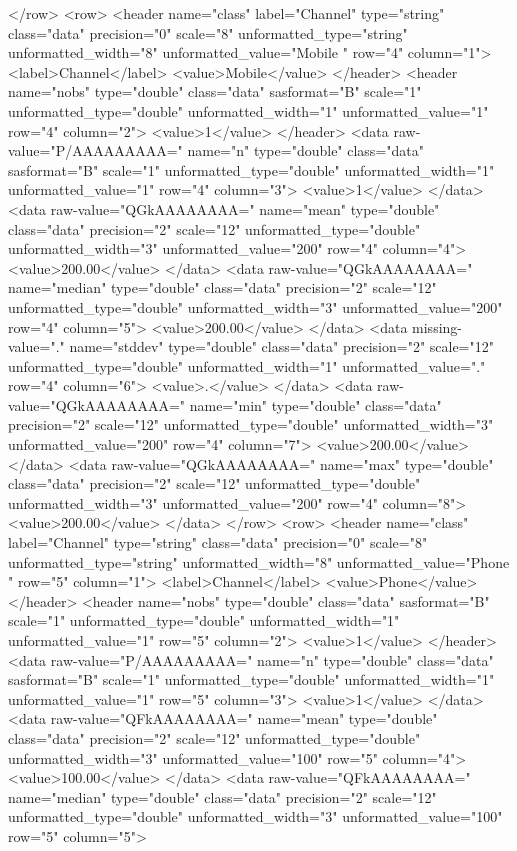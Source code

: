 </row>
<row>
<header name="class" label="Channel" type="string" class="data" precision="0" scale="8" unformatted_type="string" unformatted_width="8" unformatted_value="Mobile  " row="4" column="1">
<label>Channel</label>
<value>Mobile</value>
</header>
<header name="nobs" type="double" class="data" sasformat="B" scale="1" unformatted_type="double" unformatted_width="1" unformatted_value="1" row="4" column="2">
<value>1</value>
</header>
<data raw-value="P/AAAAAAAAA=" name="n" type="double" class="data" sasformat="B" scale="1" unformatted_type="double" unformatted_width="1" unformatted_value="1" row="4" column="3">
<value>1</value>
</data>
<data raw-value="QGkAAAAAAAA=" name="mean" type="double" class="data" precision="2" scale="12" unformatted_type="double" unformatted_width="3" unformatted_value="200" row="4" column="4">
<value>200.00</value>
</data>
<data raw-value="QGkAAAAAAAA=" name="median" type="double" class="data" precision="2" scale="12" unformatted_type="double" unformatted_width="3" unformatted_value="200" row="4" column="5">
<value>200.00</value>
</data>
<data missing-value="." name="stddev" type="double" class="data" precision="2" scale="12" unformatted_type="double" unformatted_width="1" unformatted_value="." row="4" column="6">
<value>.</value>
</data>
<data raw-value="QGkAAAAAAAA=" name="min" type="double" class="data" precision="2" scale="12" unformatted_type="double" unformatted_width="3" unformatted_value="200" row="4" column="7">
<value>200.00</value>
</data>
<data raw-value="QGkAAAAAAAA=" name="max" type="double" class="data" precision="2" scale="12" unformatted_type="double" unformatted_width="3" unformatted_value="200" row="4" column="8">
<value>200.00</value>
</data>
</row>
<row>
<header name="class" label="Channel" type="string" class="data" precision="0" scale="8" unformatted_type="string" unformatted_width="8" unformatted_value="Phone   " row="5" column="1">
<label>Channel</label>
<value>Phone</value>
</header>
<header name="nobs" type="double" class="data" sasformat="B" scale="1" unformatted_type="double" unformatted_width="1" unformatted_value="1" row="5" column="2">
<value>1</value>
</header>
<data raw-value="P/AAAAAAAAA=" name="n" type="double" class="data" sasformat="B" scale="1" unformatted_type="double" unformatted_width="1" unformatted_value="1" row="5" column="3">
<value>1</value>
</data>
<data raw-value="QFkAAAAAAAA=" name="mean" type="double" class="data" precision="2" scale="12" unformatted_type="double" unformatted_width="3" unformatted_value="100" row="5" column="4">
<value>100.00</value>
</data>
<data raw-value="QFkAAAAAAAA=" name="median" type="double" class="data" precision="2" scale="12" unformatted_type="double" unformatted_width="3" unformatted_value="100" row="5" column="5">
